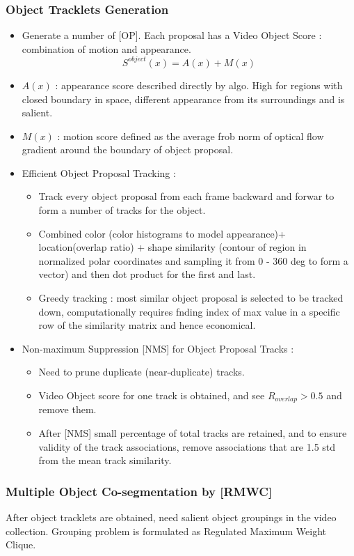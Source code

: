 \documentclass{article}
\begin{document}
\subsubsection{Object Tracklets Generation}
\begin{itemize}
\item Generate a number of [OP]. Each proposal has a Video Object Score : combination of motion and appearance. $$S^{object}(x) = A(x) + M(x)$$
\item $A(x)$ : appearance score described directly by algo. High for regions with closed boundary in space, different appearance from its surroundings and is salient.
\item $M(x)$ : motion score defined as the average frob norm of optical flow gradient around the boundary of object proposal.
\item Efficient Object Proposal Tracking :
  \begin{itemize}
  \item Track every object proposal from each frame backward and forwar to form a number of tracks for the object.
  \item Combined color (color histograms to model appearance)+ location(overlap ratio) + shape similarity (contour of region in normalized polar coordinates and sampling it from 0 - 360 deg to form a vector) and then dot product for the first and last.
  \item Greedy tracking : most similar object proposal is selected to be tracked down, computationally requires fnding index of max value in a specific row of the similarity matrix and hence economical.
  \end{itemize}
\item Non-maximum Suppression [NMS] for Object Proposal Tracks :
  \begin{itemize}
  \item Need to prune duplicate (near-duplicate) tracks.
  \item Video Object score for one track is obtained, and see $R_{overlap} > 0.5$ and remove them.
  \item After [NMS] small percentage of total tracks are retained, and to ensure validity of the track associations, remove associations that are 1.5 std from the mean track similarity.
  \end{itemize}
\end{itemize}

\subsubsection{Multiple Object Co-segmentation by [RMWC]}
After object tracklets are obtained, need salient object groupings in the video collection. Grouping problem is formulated as Regulated Maximum Weight Clique.
\end{document}
